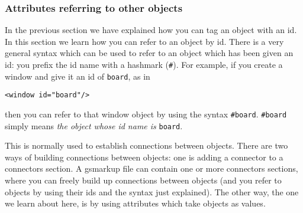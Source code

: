 \subsubsection{Attributes referring to other objects}
In the previous section we have explained how you can tag an object
with an id.  In this section we learn how you can refer to an object
by id.  There is a very general syntax which can be used to refer to
an object which has been given an id: you prefix the id name with a
hashmark (\texttt{\#}).  For example, if you create a window and give
it an id of \texttt{board}, as in
\begin{verbatim}
<window id="board"/>
\end{verbatim}
then you can refer to that window object by using the syntax
\texttt{\#board}.  \texttt{\#board} simply means {\it the object whose id name 
is} \texttt{board}.

This is normally used to establish connections between objects.  There
are two ways of building connections between objects: one is adding a
connector to a connectors section.  A gsmarkup file can contain one or
more connectors sections, where you can freely build up connections
between objects (and you refer to objects by using their ids and the
syntax just explained).  The other way, the one we learn about here,
is by using attributes which take objects as values.

